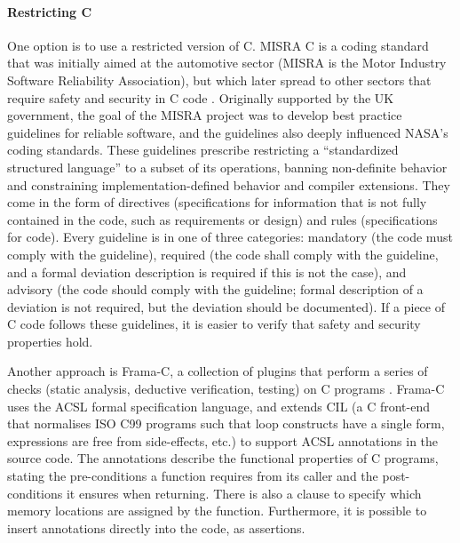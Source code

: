 \paragraph{Restricting C}
One option is to use a restricted version of C.
MISRA C is a coding standard that was initially aimed at the automotive sector (MISRA is the Motor Industry Software Reliability Association), but which later spread to other sectors that require safety and security in C code \cite{bagnara2018}.
Originally supported by the UK government, the goal of the MISRA project was to develop best practice guidelines for reliable software, and the guidelines also deeply influenced NASA's coding standards.
These guidelines prescribe restricting a ``standardized structured language'' to a subset of its operations, banning non-definite behavior and constraining implementation-defined behavior and compiler extensions.
They come in the form of directives (specifications for information that is not fully contained in the code, such as requirements or design) and rules (specifications for code).
Every guideline is in one of three categories: mandatory (the code must comply with the guideline), required (the code shall comply with the guideline, and a formal deviation description is required if this is not the case), and advisory (the code should comply with the guideline; formal description of a deviation is not required, but the deviation should be documented).
If a piece of C code follows these guidelines, it is easier to verify that safety and security properties hold.

Another approach is Frama-C, a collection of plugins that perform a series of checks (static analysis, deductive verification, testing) on C programs \cite{cuoq2012}.
Frama-C uses the ACSL formal specification language, and extends CIL (a C front-end that normalises ISO C99 programs such that loop constructs have a single form, expressions are free from side-effects, etc.) to support ACSL annotations in the source code.
The annotations describe the functional properties of C programs, stating the pre-conditions a function requires from its caller and the post-conditions it ensures when returning.
There is also a clause to specify which memory locations are assigned by the function.
Furthermore, it is possible to insert annotations directly into the code, as assertions.

